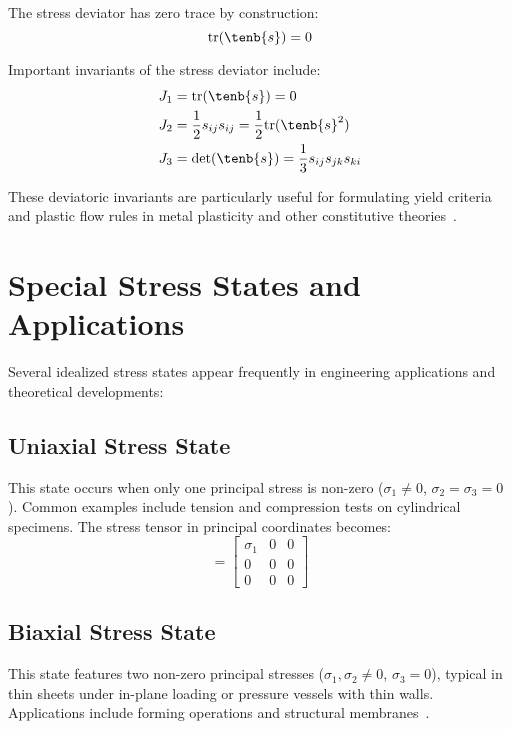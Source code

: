 The stress deviator has zero trace by construction:
\begin{equation}
\text{tr}(\tenb{s}) = 0
\end{equation}

Important invariants of the stress deviator include:
\begin{align}
J_1 &= \text{tr}(\tenb{s}) = 0\\
J_2 &= \frac{1}{2}s_{ij}s_{ij} = \frac{1}{2}\text{tr}(\tenb{s}^2)\\
J_3 &= \det(\tenb{s}) = \frac{1}{3}s_{ij}s_{jk}s_{ki}
\end{align}

These deviatoric invariants are particularly useful for formulating yield criteria and plastic flow rules in metal plasticity and other constitutive theories~\autocite{Sadd.2019}.

\section{Special Stress States and Applications}

Several idealized stress states appear frequently in engineering applications and theoretical developments:

\subsection{Uniaxial Stress State}
This state occurs when only one principal stress is non-zero ($\sigma_1 \neq 0$, $\sigma_2 = \sigma_3 = 0$). Common examples include tension and compression tests on cylindrical specimens. The stress tensor in principal coordinates becomes:
\begin{equation}
[\tenb{\sigma}] = \begin{bmatrix} \sigma_1 & 0 & 0 \\ 0 & 0 & 0 \\ 0 & 0 & 0 \end{bmatrix}
\end{equation}

\subsection{Biaxial Stress State}
This state features two non-zero principal stresses ($\sigma_1, \sigma_2 \neq 0$, $\sigma_3 = 0$), typical in thin sheets under in-plane loading or pressure vessels with thin walls. Applications include forming operations and structural membranes~\autocite{Sadd.2019}.

